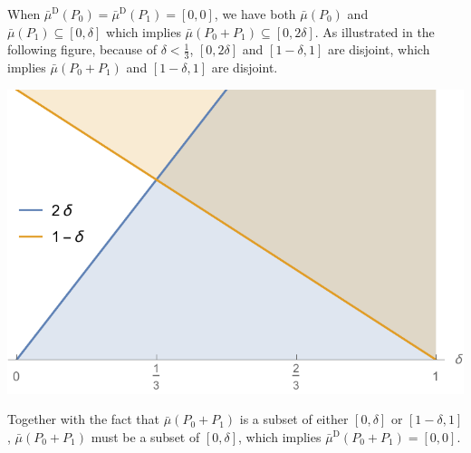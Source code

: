 \documentclass[english,reprint, aps, prl,superscriptaddress, showpacs,
showkeys, longbibliography, amsmath, amssymb, floatfix]{revtex4-1}
\theoremstyle{plain}
\theoremstyle{definition}
\newcommand{\imposs}{\ensuremath{\left[0,0\right]}}
\begin{document}
When $\bar{\mu}^{\textrm{D}}\left(P_{0}\right)=\bar{\mu}^{\textrm{D}}\left(P_{1}\right)=\imposs$,
we have both $\bar{\mu}\left(P_{0}\right)$ and $\bar{\mu}\left(P_{1}\right)\subseteq\left[0,\delta\right]$
which implies $\bar{\mu}\left(P_{0}+P_{1}\right)\subseteq\left[0,2\delta\right]$.
As illustrated in the following figure, because of $\delta<\frac{1}{3}$,
$\left[0,2\delta\right]$ and $\left[1-\delta,1\right]$ are disjoint,
which implies $\bar{\mu}\left(P_{0}+P_{1}\right)$ and $\left[1-\delta,1\right]$
are disjoint.
\begin{center}
\includegraphics[scale=0.5]{prop_prop_letter_ajhs_referee_response_nb}
\par\end{center}

\noindent Together with the fact that $\bar{\mu}\left(P_{0}+P_{1}\right)$
is a subset of either $\left[0,\delta\right]$ or $\left[1-\delta,1\right]$,
$\bar{\mu}\left(P_{0}+P_{1}\right)$ must be a subset of $\left[0,\delta\right]$,
which implies $\bar{\mu}^{\textrm{D}}\left(P_{0}+P_{1}\right)=\imposs$.
\end{document}
